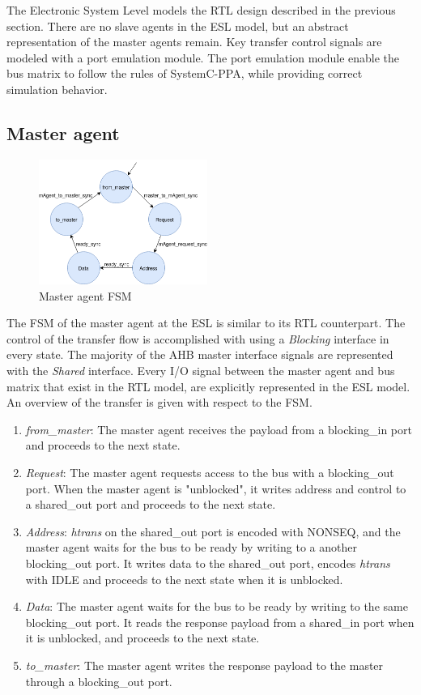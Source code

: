 The Electronic System Level models the RTL design described in the previous section. There are no slave agents in the ESL model, but an abstract representation of the master agents remain. Key transfer control signals are modeled with a port emulation module. The port emulation module enable the bus matrix to follow the rules of SystemC-PPA, while providing correct simulation behavior.  
\newpage

\subsection{Master agent}
\begin{figure}
\includegraphics[width=5.5cm]{figs/ESL/mAgent_ESL.png}
\caption{Master agent FSM}\label{fig:eafsm}
\end{figure}
The FSM of the master agent at the ESL is similar to its RTL counterpart. The control of the transfer flow is accomplished with using a \textit{Blocking} interface in every state. The majority of the AHB master interface signals are represented with the \textit{Shared} interface. Every I/O signal between the master agent and bus matrix that exist in the RTL model, are explicitly represented in the ESL model. An overview of the transfer is given with respect to the FSM. \\
\vspace{0.5cm} 

\begin{enumerate}
 \item \textit{from\_master}: The master agent receives the payload from a blocking\_in port and proceeds to the next state.
 \item \textit{Request}: The master agent requests access to the bus with a blocking\_out port. When the master agent is "unblocked", it writes address and control to a shared\_out port and proceeds to the next state.
 \item \textit{Address}: \textit{htrans} on the shared\_out port is encoded with NONSEQ, and the master agent waits for the bus to be ready by writing to a another blocking\_out port. It writes data to the shared\_out port, encodes \textit{htrans} with IDLE and proceeds to the next state when it is unblocked.
 \item \textit{Data}: The master agent waits for the bus to be ready by writing to the same blocking\_out port. It reads the response payload from a shared\_in port when it is unblocked, and proceeds to the next state. 
 \item \textit{to\_master}: The master agent writes the response payload to the master through a blocking\_out port. 
\end{enumerate} 

